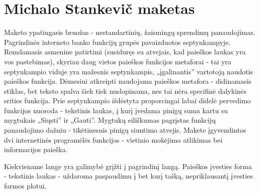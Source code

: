 \documentclass{VUMIFPSkursinis}
\begin{document}
\section{Michalo Stankevič maketas}
Maketo ypatingasis bruožas - nestandartinių, žaismingų sprendimų panaudojimas. Pagrindinės interneto banko funkcijų grupės pavaizduotos septynkampyje. Remdamasis asmenine patirtimi (susiduręs su atvejais, kad paieškos laukas yra vos pastebimas), skyriau daug vietos paieškos funkcijos metaforai - tai yra septynkampio viduje yra mažesnis septynkampis, „įgalinantis” vartotoją naudotis paieškos funkcija. Dėmesiui atkreipti naudojama paieškos metafora - didinamasis stiklas, bet teksto spalva šiek tiek nuslopinama, nes tai nėra specifinė dalykinės srities funkcija. Prie septynkampio išdėstyta proporcingai labai didelė pervedimo funkcijos nuoroda - tekstinis laukas, į kurį įvedama pinigų suma kartu su mygtukais „Siųsti” ir „Gauti”. Mygtukų eiliškumas pagrįstas funkcijų panaudojimo dažniu - tikėtinesnis pinigų siuntimo atvejis.
Makete įgyvendintos dvi internetinės programėlės funkcijos - vietinio mokėjimo atlikimas bei informacijos paieška. \par
Kiekviename lange yra galimybė grįžti į pagrindinį langą. Paieškos įvesties forma - tekstinis laukas - uždaroma paspaudimu į bet kurį tašką, nepriklausantį įvesties formos plotui.
\end{document}
